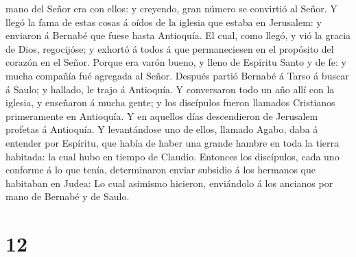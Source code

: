 mano del Señor era con ellos: y creyendo, gran número se convirtió al
Señor.  Y llegó la fama de estas cosas á oídos de la
iglesia que estaba en Jerusalem: y enviaron á Bernabé que fuese hasta
Antioquía.  El cual, como llegó, y vió la gracia de Dios,
regocijóse; y exhortó á todos á que permaneciesen en el propósito del
corazón en el Señor.  Porque era varón bueno, y lleno de
Espíritu Santo y de fe: y mucha compañía fué agregada al Señor.
 Después partió Bernabé á Tarso á buscar á Saulo; y
hallado, le trajo á Antioquía.  Y conversaron todo un año
allí con la iglesia, y enseñaron á mucha gente; y los discípulos fueron
llamados Cristianos primeramente en Antioquía.  Y en
aquellos días descendieron de Jerusalem profetas á Antioquía.
 Y levantándose uno de ellos, llamado Agabo, daba á
entender por Espíritu, que había de haber una grande hambre en toda la
tierra habitada: la cual hubo en tiempo de Claudio. 
Entonces los discípulos, cada uno conforme á lo que tenía, determinaron
enviar subsidio á los hermanos que habitaban en Judea:  Lo
cual asimismo hicieron, enviándolo á los ancianos por mano de Bernabé y
de Saulo.

\hypertarget{section-11}{%
\section{12}\label{section-11}}

